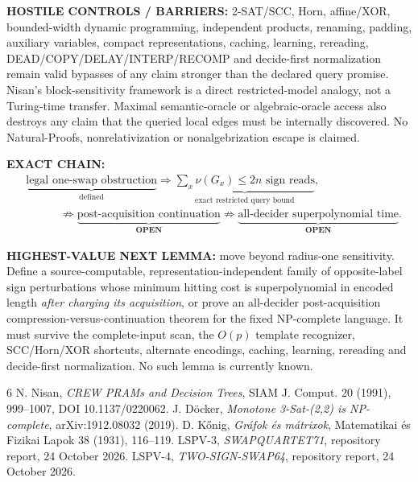 \documentclass[11pt]{article}
\newcommand{\OPEN}{\textbf{OPEN}}
\begin{document}
\textbf{HOSTILE CONTROLS / BARRIERS:} 2-SAT/SCC, Horn, affine/XOR,
bounded-width dynamic programming, independent products, renaming, padding,
auxiliary variables, compact representations, caching, learning, rereading,
DEAD/COPY/DELAY/INTERP/RECOMP and decide-first normalization remain valid
bypasses of any claim stronger than the declared query promise. Nisan's
block-sensitivity framework is a direct restricted-model analogy, not a
Turing-time transfer. Maximal semantic-oracle or algebraic-oracle access
also destroys any claim that the queried local edges must be internally
discovered. No Natural-Proofs, nonrelativization or nonalgebrization escape
is claimed.

\textbf{EXACT CHAIN:}
\begin{align*}
&\underbrace{\text{legal one-swap obstruction}}_{\text{defined}}
\Longrightarrow
\underbrace{\sum_x\nu(G_x)\le2n\text{ sign reads}}_{\text{exact restricted query bound}},\\
&\hspace{3em}\not\Longrightarrow
\underbrace{\text{post-acquisition continuation}}_{\OPEN}
\not\Longrightarrow
\underbrace{\text{all-decider superpolynomial time}}_{\OPEN}.
\end{align*}

\textbf{HIGHEST-VALUE NEXT LEMMA:} move beyond radius-one sensitivity.
Define a source-computable, representation-independent family of
opposite-label sign perturbations whose minimum hitting cost is
superpolynomial in encoded length \emph{after charging its acquisition}, or
prove an all-decider post-acquisition compression-versus-continuation theorem
for the fixed NP-complete language. It must survive the complete-input scan,
the $O(p)$ template recognizer, SCC/Horn/XOR shortcuts, alternate encodings,
caching, learning, rereading and decide-first normalization. No such lemma
is currently known.

\begin{thebibliography}{6}
N. Nisan, \emph{CREW PRAMs and Decision Trees}, SIAM J. Comput. 20
(1991), 999--1007, DOI 10.1137/0220062.
J. D\"ocker, \emph{Monotone 3-Sat-(2,2) is NP-complete},
arXiv:1912.08032 (2019).
D. K\H{o}nig, \emph{Gr\'afok \'es m\'atrixok}, Matematikai \'es Fizikai
Lapok 38 (1931), 116--119.
LSPV-3, \emph{SWAPQUARTET71}, repository report, 24 October 2026.
LSPV-4, \emph{TWO-SIGN-SWAP64}, repository report, 24 October 2026.
\end{thebibliography}
\end{document}
